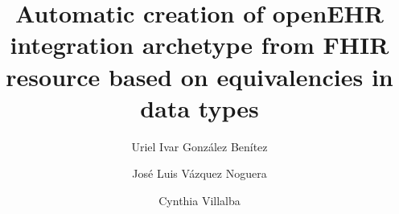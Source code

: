 \title{Automatic creation of openEHR integration archetype from FHIR resource based on equivalencies in data types}

\author{Uriel Ivar González Benítez}

\author{José Luis Vázquez Noguera}

\author{Cynthia Villalba}
